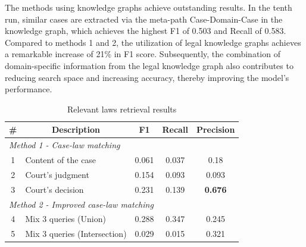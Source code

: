 \documentclass[conference]{IEEEtran}
\begin{document}
The methods using knowledge graphs achieve outstanding results. In the tenth run, similar cases are extracted via the meta-path Case-Domain-Case in the knowledge graph, which achieves the highest F1 of 0.503 and Recall of 0.583. Compared to methods 1 and 2, the utilization of legal knowledge graphs achieves a remarkable increase of 21\% in F1 score. Subsequently, the combination of domain-specific information from the legal knowledge graph also contributes to reducing search space and increasing accuracy, thereby improving the model's performance.

\begin{table}[ht]
\caption{Relevant laws retrieval results}
\label{tab:result}
\centering
\begin{tabular}{|c|l|c|c|c|}
\hline
\multicolumn{1}{|c|}{\textbf{\#}} & \multicolumn{1}{c|}{\textbf{Description}} & \multicolumn{1}{c|}{\textbf{F1}}    & \multicolumn{1}{c|}{\textbf{Recall}} & \textbf{Precision} \\ \hline
\multicolumn{5}{|l|}{\textit{Method 1 - Case-law matching}}                                                                                                                                                       \\ \hline
\multicolumn{1}{|c|}{1}           & \multicolumn{1}{l|}{Content of the case}                & \multicolumn{1}{c|}{0.061}          & \multicolumn{1}{c|}{0.037}           & 0.18               \\ \hline
\multicolumn{1}{|c|}{2}           & \multicolumn{1}{l|}{Court's judgment}                    & \multicolumn{1}{c|}{0.154}          & \multicolumn{1}{c|}{0.093}           & 0.093              \\ \hline
\multicolumn{1}{|c|}{3}           & \multicolumn{1}{l|}{Court's decision}                   & \multicolumn{1}{c|}{0.231}          & \multicolumn{1}{c|}{0.139}           & \textbf{0.676}     \\ \hline
\multicolumn{5}{|l|}{\textit{Method 2 - Improved case-law matching}}                                                                                                                                                       \\ \hline
\multicolumn{1}{|c|}{4}           & \multicolumn{1}{l|}{Mix 3 queries (Union)}              & \multicolumn{1}{c|}{0.288}          & \multicolumn{1}{c|}{0.347}           & 0.245              \\ \hline
\multicolumn{1}{|c|}{5}           & \multicolumn{1}{l|}{Mix 3 queries (Intersection)}       & \multicolumn{1}{c|}{0.029}          & \multicolumn{1}{c|}{0.015}           & 0.321              \\ \hline

\end{tabular}
\end{table}
\end{document}
